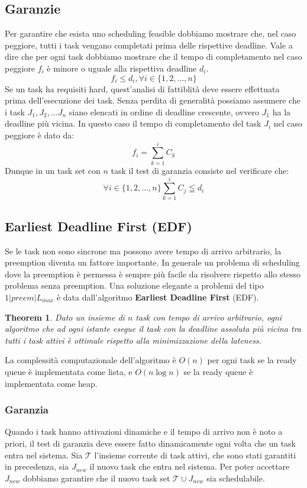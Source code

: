 \documentclass[12pt]{article}
\newtheorem{theorem}{Theorem}
\begin{document}
\subsection{Garanzie}
Per garantire che esista uno scheduling feasible dobbiamo mostrare che, nel caso peggiore, tutti i task vengano completati prima delle rispettive deadline.
Vale a dire che per ogni task dobbiamo mostrare che il tempo di completamento nel caso peggiore $f_i$ è minore o uguale alla rispettiva deadline $d_i$.
\begin{equation}
    f_i \leq d_i , \forall i \in \{1,2,\ldots,n\}
\end{equation}
Se un task ha requisiti hard, quest'analisi di fattiblità deve essere effettuata prima dell'esecuzione dei task.
Senza perdita di generalità possiamo assumere che i task $J_1,J_2,\dots J_n$ siano elencati in ordine di deadline crescente, ovvero $J_1$ ha la deadline più vicina.
In questo caso il tempo di completamento del task $J_i$ nel caso peggiore è dato da:
\begin{equation}
    f_i=\sum_{k=1}^{i} C_k
\end{equation}
Dunque in un task set con $n$ task il test di garanzia consiste nel verificare che:
\begin{equation}
    \forall i \in \{1,2,\dots ,n\} \sum_{k=1}^i C_j \leqq d_i
\end{equation}
\subsection{Earliest Deadline First (EDF)}
Se le task non sono sincrone ma possono avere tempo di arrivo arbitrario, la preemption diventa un fattore importante.
In generale un problema di scheduling dove la preemption è permessa è sempre più facile da risolvere rispetto allo stesso problema senza preemption.
Una soluzione elegante a problemi del tipo $1|preem|L_{max}$ è data dall'algoritmo \textbf{Earliest Deadline First} (EDF).
\begin{theorem}
    Dato un insieme di $n$ task con tempo di arrivo arbitrario, ogni algoritmo che ad ogni istante esegue il task con la deadline assoluta più vicina tra tutti i task attivi è ottimale rispetto alla minimizzazione della lateness.
\end{theorem}
La complessità computazionale dell'algoritmo è $O(n)$ per ogni task se la ready queue è implementata come lista, e $O(n\log n)$ se la ready queue è implementata come heap.
\subsubsection{Garanzia}
Quando i task hanno attivazioni dinamiche e il tempo di arrivo non è noto a priori, il test di garanzia deve essere fatto dinamicamente ogni volta che un task entra nel sistema.
Sia $\mathcal{T}$ l'insieme corrente di task attivi, che sono stati garantiti in precedenza, sia $J_{new}$ il nuovo task che entra nel sistema.
Per poter accettare $J_{new}$ dobbiamo garantire che il nuovo task set $\mathcal{T} \cup J_{new}$ sia schedulabile.
\end{document}
